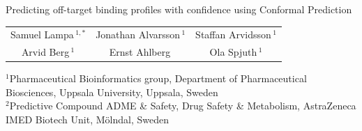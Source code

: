 \documentclass[10pt,article]{memoir}
\begin{document}
\begin{center}
{\LARGE\noindent Predicting off-target binding profiles with confidence using Conformal
Prediction}
\end{center}

\begin{center}
\noindent
\begin{tabular}{ccc}
Samuel Lampa\,$^{1,*}$  & Jonathan Alvarsson\,$^{1}$ &  Staffan Arvidsson\,$^{1}$ \\
 Arvid Berg\,$^{1}$ &Ernst Ahlberg\, & Ola Spjuth\,$^{1}$ \\
\end{tabular}
\end{center}

\noindent
\begin{minipage}{1.1\textwidth}
\noindent\footnotesize $^1$Pharmaceutical Bioinformatics group, Department of Pharmaceutical Biosciences, Uppsala University, Uppsala, Sweden \\ 
\noindent\footnotesize $^2$Predictive Compound ADME \& Safety, Drug Safety \& Metabolism, AstraZeneca IMED Biotech Unit, Mölndal, Sweden \\ 
\end{minipage}


\def\keyFont{\fontsize{8}{11}\helveticabold }
\def\firstAuthorLast{Lampa {et~al.}} %
\def\Authors{Samuel Lampa\,$^{1,*}$, Jonathan Alvarsson\,$^{1}$, Staffan Arvidsson\,$^{1}$, Arvid Berg\,$^{1}$, Ernst Ahlberg\,$^{2}$  and Ola Spjuth\,$^{1}$}
\def\Address{$^{1}$Pharmaceutical Bioinformatics group, Department of Pharmaceutical Biosciences, Uppsala University, Uppsala, Sweden\\
$^{2}$Predictive Compound ADME \& Safety, Drug Safety \& Metabolism, AstraZeneca IMED Biotech Unit, M"olndal, Sweden}
\def\corrAuthor{Corresponding Author}

\def\corrEmail{samuel.lampa@farmbio.uu.se}
\end{document}
